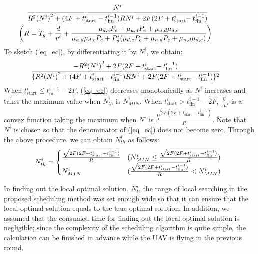 \documentclass{ieeeaccess}
\begin{document}
\begin{align}
&\hspace{-0.2cm}\frac{N^i}{R^2{(N^i)}^2+(4F+t_{\mathrm{start}}^i-t_{\mathrm{fin}}^{i-1})R{N^i}+2F(2F+t_{\mathrm{start}}^i\hspace{-1mm}-t_{\mathrm{fin}}^{i-1})}\hspace{1cm}\label{eq_ec}\\
&\hspace{-0.6cm}\biggl(R=T_g+\frac{d}{v^i}+\frac{\mu_{d,e}P_e+\mu_{u,d}P_e+\mu_{u,d}\mu_{d,e}}{\mu_{u,d}\mu_{d,e}P_e+P_u^i(\mu_{d,e}P_e+\mu_{u,d}P_e+\mu_{u,d}\mu_{d,e})}\biggr)\nonumber
\end{align}
%
To sketch (\ref{eq_ec}), by differentiating it by $N^i$, we obtain:
%
\begin{align}
\hspace{-4mm} \frac{-{R^2{(N^i)}^2}+2F(2F+t_{\mathrm{start}}^i\hspace{-1mm}-t_{\mathrm{fin}}^{i-1})}{\{R^2{(N^i)}^2+(4F+t_{\mathrm{start}}^i\hspace{-1mm}-t_{\mathrm{fin}}^{i-1})R{N^i}+2F(2F+t_{\mathrm{start}}^i\hspace{-1mm}-t_{\mathrm{fin}}^{i-1})\}^2}
\end{align}
%
When $t_{\mathrm{start}}^i \leq{t_{\mathrm{fin}}^{i-1}-2F}$, (\ref{eq_ec}) decreases monotonically as $N^i$ increases and takes the maximum value when $N_{th}^i$ is $N_{MIN}^i$.
%
When $t_{\mathrm{start}}^i >{t_{\mathrm{fin}}^{i-1}-2F}$, $\frac{\eta^{i}}{{\Delta{t}}^i}$ is a convex function taking the maximum when $N^i$ is $\frac{\sqrt{2F(2F+t_{\mathrm{start}}^i-t_{\mathrm{fin}}^{i-1})}}{R}$.
%
Note that $N^i$ is chosen so that the denominator of (\ref{eq_ec}) does not become zero.
%
Through the above procedure, we can obtain $N_{th}^i$ as follows:
%
\begin{align}
 \hspace{-1.5mm} N_{th}^i= \begin{cases}
    \frac{\sqrt{2F(2F+t_{\mathrm{start}}^i-t_{\mathrm{fin}}^{i-1})}}{R} & ({N_{MIN}^i}\leq{\frac{\sqrt{2F(2F+t_{\mathrm{start}}^i-t_{\mathrm{fin}}^{i-1})}}{R}}) \\
    N_{MIN}^i& (\frac{\sqrt{2F(2F+t_{\mathrm{start}}^i-t_{\mathrm{fin}}^{i-1})}}{R}<{N_{MIN}^i})
  \end{cases}
\end{align}

In finding out the local optimal solution, $N_{l}^i$, the range of local searching in the proposed scheduling method was set enough wide so that it can ensure that the local optimal solution equals to the true optimal solution.
%
In addition, we assumed that the consumed time for finding out the local optimal solution is negligible; since the complexity of the scheduling algorithm is quite simple, the calculation can be finished in advance while the UAV is flying in the previous round.
\end{document}
